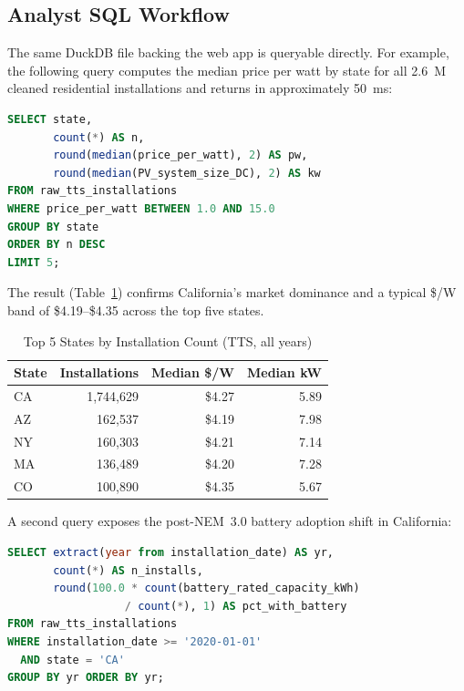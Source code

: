 \documentclass[10pt, conference]{IEEEtran}
\begin{document}
\subsection{Analyst SQL Workflow}

The same DuckDB file backing the web app is queryable directly. For example, the following query computes the median price per watt by state for all 2.6~M cleaned residential installations and returns in approximately 50~ms:

\begin{lstlisting}[language=SQL]
SELECT state,
       count(*) AS n,
       round(median(price_per_watt), 2) AS pw,
       round(median(PV_system_size_DC), 2) AS kw
FROM raw_tts_installations
WHERE price_per_watt BETWEEN 1.0 AND 15.0
GROUP BY state
ORDER BY n DESC
LIMIT 5;
\end{lstlisting}

The result (Table~\ref{tab:state_medians}) confirms California's market dominance and a typical \$/W band of \$4.19--\$4.35 across the top five states.

\begin{table}[H]
\centering
\caption{Top 5 States by Installation Count (TTS, all years)}
\label{tab:state_medians}
\small
\begin{tabular}{lrrr}
\toprule
\textbf{State} & \textbf{Installations} & \textbf{Median \$/W} & \textbf{Median kW} \\
\midrule
CA & 1{,}744{,}629 & \$4.27 & 5.89 \\
AZ & 162{,}537 & \$4.19 & 7.98 \\
NY & 160{,}303 & \$4.21 & 7.14 \\
MA & 136{,}489 & \$4.20 & 7.28 \\
CO & 100{,}890 & \$4.35 & 5.67 \\
\bottomrule
\end{tabular}
\end{table}

A second query exposes the post-NEM~3.0 battery adoption shift in California:

\begin{lstlisting}[language=SQL]
SELECT extract(year from installation_date) AS yr,
       count(*) AS n_installs,
       round(100.0 * count(battery_rated_capacity_kWh)
                  / count(*), 1) AS pct_with_battery
FROM raw_tts_installations
WHERE installation_date >= '2020-01-01'
  AND state = 'CA'
GROUP BY yr ORDER BY yr;
\end{lstlisting}
\end{document}
